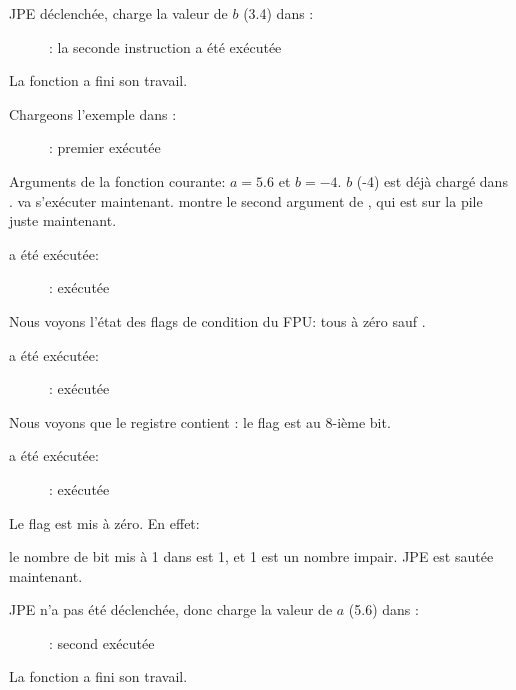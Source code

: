\clearpage
\ac{JPE} déclenchée, \FLD charge la valeur de $b$ (3.4) dans :

\begin{figure}[H]
\centering
{}
\caption{\olly: la seconde instruction \FLD a été exécutée}
\label{fig:FPU_comparison_case1_olly5}
\end{figure}

La fonction a fini son travail.

\clearpage
{}

Chargeons l'exemple dans \olly:

\begin{figure}[H]
\centering
{}
\caption{\olly: premier \FLD exécutée}
\label{fig:FPU_comparison_case2_olly1}
\end{figure}

Arguments de la fonction courante: $a=5.6$ et $b=-4$.
$b$ (-4) est déjà chargé dans .
\FCOMP va s'exécuter maintenant.
\olly montre le second argument de \FCOMP, qui est sur la pile juste maintenant.

\clearpage
\FCOMP a été exécutée:

\begin{figure}[H]
\centering
{}
\caption{\olly: \FCOMP exécutée}
\label{fig:FPU_comparison_case2_olly2}
\end{figure}

Nous voyons l'état des flags de condition du \ac{FPU}: tous à zéro sauf \Czero.

\clearpage
\FNSTSW a été exécutée:

\begin{figure}[H]
\centering
{}
\caption{\olly: \FNSTSW exécutée}
\label{fig:FPU_comparison_case2_olly3}
\end{figure}

Nous voyons que le registre  contient : le flag \Czero est au 8-ième bit.

\clearpage
\TEST a été exécutée:

\begin{figure}[H]
\centering
{}
\caption{\olly: \TEST exécutée}
\label{fig:FPU_comparison_case2_olly4}
\end{figure}

Le flag  est mis à zéro.
En effet:

le nombre de bit mis à 1 dans  est 1, et 1 est un nombre impair.
\ac{JPE} est sautée maintenant.

\clearpage
\ac{JPE} n'a pas été déclenchée, donc \FLD charge la valeur de $a$ (5.6) dans :

\begin{figure}[H]
\centering
{}
\caption{\olly: second \FLD exécutée}
\label{fig:FPU_comparison_case2_olly5}
\end{figure}

La fonction a fini son travail.
